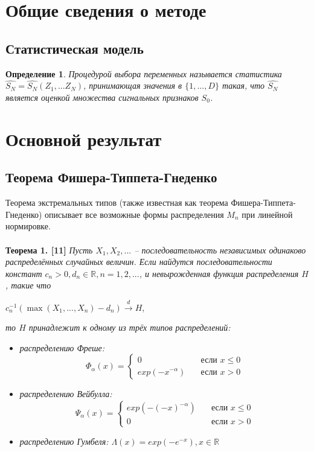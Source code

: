 \documentclass[14pt,a4paper]{extarticle}
\newtheorem{definition}{Определение} %
\begin{document}
\section{Общие сведения о методе}
\subsection{Статистическая модель}

 \begin{definition}
\textit{Процедурой выбора переменных} называется статистика $\hat{S_N} = \hat{S_N}(Z_1, ... Z_N)$, принимающая значения в $\{1, . . . , D\} $ такая, что $\hat{S_N}$ является оценкой множества сигнальных признаков $S_0$.
\end{definition}


\section{Основной результат}


\subsection{Теорема Фишера-Типпета-Гнеденко}

Теорема экстремальных типов (также известная как теорема Фишера-Типпета-Гнеденко) описывает все возможные формы распределения $M_n$ при линейной нормировке. 
\\
\\
\textbf{Теорема 1. [11]} \textit{
Пусть $X_1, X_2, ...$ -- последовательность независимых одинаково распределённых случайных величин. Если найдутся последовательности констант $c_n > 0, d_n \in \mathbb{R}, n = 1,2,...$, и невырожденная функция распределения $H$, такие что} 
\begin{center}
  $c_n^{-1}(\max(X_1,...,X_n)-d_n) \xrightarrow{d} H$,
\end{center}
\textit{то $H$ принадлежит к одному из трёх типов распределений:}
\begin{itemize}
  \item \textit{распределению Фреше: \[ \Phi_\alpha(x) =
  \begin{cases}
    0      & \quad \text{если } x \leq 0\\
    exp(-x^{-\alpha})  & \quad \text{если }  x > 0
  \end{cases}
\]}

\item \textit{распределению Вейбулла: \[ \Psi_\alpha(x) =
  \begin{cases}
    exp(-(-x)^{-\alpha})      & \quad \text{если } x \leq 0\\
    0  & \quad \text{если }  x > 0
  \end{cases}
\]}

\item \textit{распределению Гумбеля: 
$\Lambda(x) = exp(-e^{-x}), x \in \mathbb{R}$}

\end{itemize}
\end{document}
